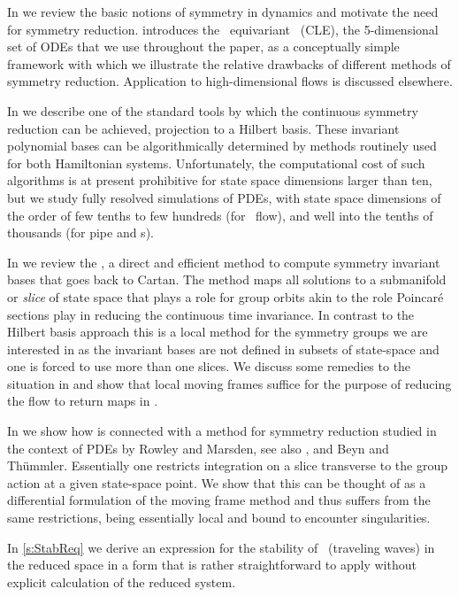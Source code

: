 In  we review the basic notions of symmetry
in dynamics and motivate the need for symmetry reduction.
 introduces the \ equivariant
\cLe\ (CLE), the 5-dimensional set of ODEs that we use
throughout the paper, as a conceptually  simple framework
with which we illustrate the relative drawbacks of different
methods of symmetry reduction. Application to
high-dimensional flows is discussed
elsewhere.

In  we describe one of the standard tools
by which the continuous symmetry reduction can be achieved,
projection to a Hilbert basis. These invariant polynomial
bases can be algorithmically determined by methods routinely
used for both Hamiltonian  systems.
Unfortunately, the computational cost of such algorithms is
at present prohibitive for state space dimensions larger than
ten, but we study fully resolved simulations of PDEs, with
state space dimensions of the order of few tenths to few
hundreds (for \KS\ flow), and well into the tenths of
thousands (for pipe and \pCf s).

In  we review the \emph{\mframes}, a direct
and efficient method to compute symmetry invariant bases that
goes back to Cartan. The method maps all solutions to a
submanifold or \emph{slice} of state space that plays a role
for group orbits akin to the role Poincar\'e sections play in
reducing the continuous time invariance. In contrast to the
Hilbert basis approach this is a local method for the
symmetry groups we are interested in as the invariant bases
are not defined in subsets of state-space and one is forced
to use more than one slices. We discuss some remedies to the
situation in 
and show that local moving frames suffice for the purpose of
reducing the flow to return maps in .

In  we show how {\mframes} is
connected with a method for symmetry reduction studied in the
context of PDEs by Rowley and
Marsden, see also
, and Beyn and
Th\"ummler.
Essentially one restricts integration on a slice transverse
to the group action at a given state-space point. We show
that this can be thought of as a differential formulation of
the moving frame method and thus suffers from the same
restrictions, being essentially local and bound to encounter
singularities.

In \ref{s:StabReq} we derive an expression for the stability
of \reqva\ (traveling waves) in the reduced space in a form
that is rather straightforward to apply without explicit
calculation of the reduced system.
